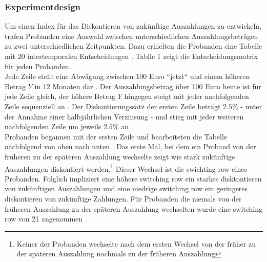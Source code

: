 \documentclass[11pt,a4paper]{article}
\begin{document}
\subsubsection{Experimentdesign}
Um einen Index für das Diskontieren von zukünftige Auszahlungen zu entwickeln, trafen Probanden eine Auswahl zwischen unterschiedlichen Auszahlungsbeträgen zu zwei unterschiedlichen Zeitpunkten. Dazu erhielten die Probanden eine Tabelle mit 20 intertemporalen Entscheidungen \parencite{dohmen2010risk}. Tablle 1 zeigt die Entscheidungsmatrix für jeden Probanden.\\
Jede Zeile stellt eine Abwägung zwischen 100 Euro “jetzt“ und einem höheren Betrag $Y$ in 12 Monaten dar \parencite{dohmen2010risk}. Der Auszahlungsbetrag über 100 Euro heute ist für jede Zeile gleich, der höhere Betrag $Y$ hingegen steigt mit jeder nachfolgenden Zeile sequenziell an \parencite{dohmen2010risk}. Der Diskontierungssatz der ersten Zeile beträgt $2.5\%$ - unter der Annahme einer halbjährlichen Verzinsung - und stieg mit jeder weiteren nachfolgenden Zeile um jeweils $2.5\%$ an \parencite{dohmen2010risk}.\\

Probanden begannen mit der ersten Zeile und bearbeiteten die Tabelle nachfolgend von oben nach unten \parencite{dohmen2010risk}. Das erste Mal, bei dem ein Proband von der früheren zu der späteren Auszahlung wechselte zeigt wie stark zukünftige Auszahlungen diskontiert werden.\footnote{Keiner der Probanden wechselte nach dem ersten Wechsel von der früher zu der späteren Auszahlung nochmals zu der früheren Auszahlung} Dieser Wechsel ist die swichting row eines Probanden. Folglich impliziert eine höhere switching row ein starkes disktontieren von zukünftigen Auszahlungen und eine niedrige switching row ein geringeres diskontieren von  zukünftige Zahlungen. Für Probanden die niemals von der früheren Auszahlung zu der späteren Auszahlung wechselten wurde eine switching row von 21 angenommen \parencite{dohmen2012interpreting}.\\
\end{document}
